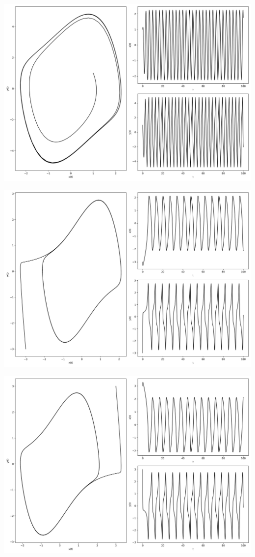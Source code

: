 \documentclass[12pt,a4paper]{jsarticle}
\makeatletter
\def\figcaption{\def\@captype{figure}\caption}
\makeatother
\begin{document}
\figcaption{$x_0=1,00, y_0=1.00, \mu=1.00, \omega=0.00, T = 200, N = 2000$}
\includegraphics[scale=0.33]{x1,0y1,0mu1,0omega2,0t1,00e+02n2,00e+03.png}
\figcaption{$x_0=1,00, y_0=1.00, \mu=1.00, \omega=2.00, T = 200, N = 2000$}
\includegraphics[scale=0.33]{x-3,0y-3,0mu1,0omega1,0t1,00e+02n2,00e+03.png}
\figcaption{$x_0=-3.00, y_0=-3.00, \mu=1,00, \omega=1.00, T = 200, N = 2000$}
\includegraphics[scale=0.33]{x3,0y3,0mu1,0omega1,0t1,00e+02n2,00e+03.png}
\end{document}
